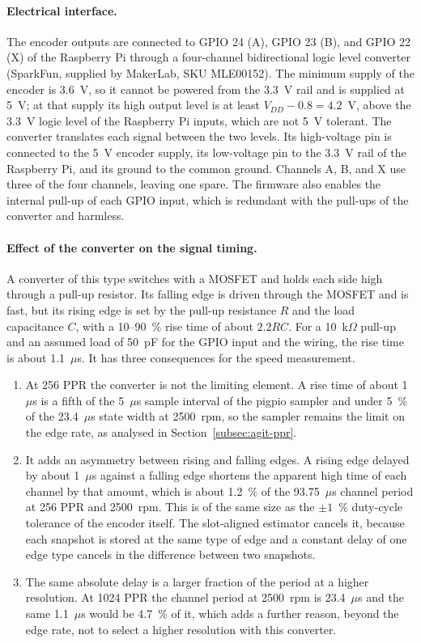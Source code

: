 \paragraph{Electrical interface.}
The encoder outputs are connected to GPIO 24 (A), GPIO 23 (B), and GPIO 22 (X) of the Raspberry Pi through a four-channel bidirectional logic level converter (SparkFun, supplied by MakerLab, SKU MLE00152). The minimum supply of the encoder is 3.6~V, so it cannot be powered from the 3.3~V rail and is supplied at 5~V; at that supply its high output level is at least $V_{DD} - 0.8 = 4.2$~V, above the 3.3~V logic level of the Raspberry Pi inputs, which are not 5~V tolerant. The converter translates each signal between the two levels. Its high-voltage pin is connected to the 5~V encoder supply, its low-voltage pin to the 3.3~V rail of the Raspberry Pi, and its ground to the common ground. Channels A, B, and X use three of the four channels, leaving one spare. The firmware also enables the internal pull-up of each GPIO input, which is redundant with the pull-ups of the converter and harmless.

\paragraph{Effect of the converter on the signal timing.}
A converter of this type switches with a MOSFET and holds each side high through a pull-up resistor. Its falling edge is driven through the MOSFET and is fast, but its rising edge is set by the pull-up resistance $R$ and the load capacitance $C$, with a 10--90~\% rise time of about $2.2RC$. For a 10~k$\Omega$ pull-up and an assumed load of 50~pF for the GPIO input and the wiring, the rise time is about 1.1~$\mu$s. It has three consequences for the speed measurement.
\begin{enumerate}
    \item At 256 PPR the converter is not the limiting element. A rise time of about 1~$\mu$s is a fifth of the 5~$\mu$s sample interval of the pigpio sampler and under 5~\% of the 23.4~$\mu$s state width at 2500~rpm, so the sampler remains the limit on the edge rate, as analysed in Section~\ref{subsec:agit-ppr}.
    \item It adds an asymmetry between rising and falling edges. A rising edge delayed by about 1~$\mu$s against a falling edge shortens the apparent high time of each channel by that amount, which is about 1.2~\% of the 93.75~$\mu$s channel period at 256 PPR and 2500~rpm. This is of the same size as the $\pm 1$~\% duty-cycle tolerance of the encoder itself. The slot-aligned estimator cancels it, because each snapshot is stored at the same type of edge and a constant delay of one edge type cancels in the difference between two snapshots.
    \item The same absolute delay is a larger fraction of the period at a higher resolution. At 1024 PPR the channel period at 2500~rpm is 23.4~$\mu$s and the same 1.1~$\mu$s would be 4.7~\% of it, which adds a further reason, beyond the edge rate, not to select a higher resolution with this converter.
\end{enumerate}

